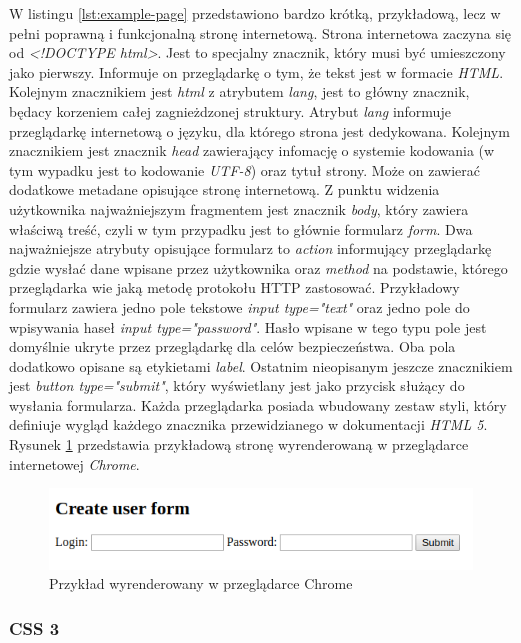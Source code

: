 \documentclass[polish, twoside, 12pt]{mwart}
\begin{document}
W listingu \ref{lst:example-page} przedstawiono bardzo krótką, przykładową, lecz w pełni poprawną i funkcjonalną stronę internetową. Strona internetowa zaczyna się od \emph{<!DOCTYPE html>}. Jest to specjalny znacznik, który musi być umieszczony jako pierwszy. Informuje on przeglądarkę o tym, że tekst jest w formacie \emph{HTML}. Kolejnym znacznikiem jest \emph{html} z atrybutem \emph{lang}, jest to główny znacznik, będacy korzeniem całej zagnieżdzonej struktury. Atrybut \emph{lang} informuje przeglądarkę internetową o języku, dla którego strona jest dedykowana. Kolejnym znacznikiem jest znacznik \emph{head} zawierający infomację o systemie kodowania (w tym wypadku jest to  kodowanie \emph{UTF-8}) oraz tytuł strony. Może on zawierać dodatkowe metadane opisujące stronę internetową. Z punktu widzenia użytkownika najważniejszym fragmentem jest znacznik \emph{body}, który zawiera właściwą treść, czyli w tym przypadku jest to głównie formularz \emph{form}. Dwa najważniejsze atrybuty opisujące formularz to \emph{action} informujący przeglądarkę gdzie wysłać dane wpisane przez użytkownika oraz \emph{method} na podstawie, którego przeglądarka wie jaką metodę protokołu HTTP zastosować. Przykładowy formularz zawiera jedno pole tekstowe \emph{input type="text"} oraz jedno pole do wpisywania haseł \emph{input type="password"}. Hasło wpisane w tego typu pole jest domyślnie ukryte przez przeglądarkę dla celów bezpieczeństwa. Oba pola dodatkowo opisane są etykietami \emph{label}. Ostatnim nieopisanym jeszcze znacznikiem jest \emph{button type="{}submit"}, który wyświetlany jest jako przycisk służący do wysłania formularza. Każda przeglądarka posiada wbudowany zestaw styli, który definiuje wygląd każdego znacznika przewidzianego w dokumentacji \emph{HTML 5}. Rysunek \ref{fig:example-page-chrome} przedstawia przykładową stronę wyrenderowaną w przeglądarce internetowej \emph{Chrome}.

\begin{figure}[ht]
  \includegraphics[width=\textwidth]{html-chrome.png}
  \caption{Przykład wyrenderowany w przeglądarce Chrome}
  \label{fig:example-page-chrome}
\end{figure}

\subsubsection{CSS 3}
\end{document}
